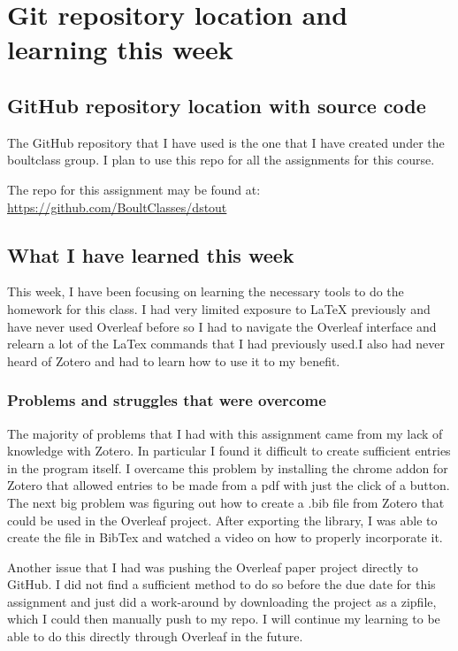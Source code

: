\documentclass[a4paper]{article}
\begin{document}
\section{Git repository location and learning this week}

\subsection{GitHub repository location with source code}

The GitHub repository that I have used is the one that I have created under the boultclass group. I plan to use 
this repo for all the assignments for this course.

The repo for this assignment may be found at:
\href{https://github.com/BoultClasses/dstout}{https://github.com/BoultClasses/dstout}

\subsection{What I have learned this week}

This week, I have been focusing on learning the necessary tools to do the homework for this class. I had very 
limited exposure to \LaTeX{} previously and have never used Overleaf before so I had to navigate the Overleaf 
interface and relearn a lot of the LaTex commands that I had previously used.I also had never heard of Zotero 
and had to learn how to use it to my benefit.

\subsubsection{Problems and struggles that were overcome}
The majority of problems that I had with this assignment came from my lack of knowledge with Zotero. In 
particular I found it difficult to create sufficient entries in the program itself. I overcame this problem by 
installing the chrome addon for Zotero that allowed entries to be made from a pdf with just the click of a 
button. The next big problem was figuring out how to create a .bib file from Zotero that could be used in the 
Overleaf project. After exporting the library, I was able to create the file in BibTex and watched a video on how to properly incorporate it.

Another issue that I had was pushing the Overleaf paper project directly to GitHub. I did not find a sufficient 
method to do so before the due date for this assignment and just did a work-around by downloading the project 
as a zipfile, which I could then manually push to my repo. I will continue my learning to be able to do this 
directly through Overleaf in the future.
\end{document}
